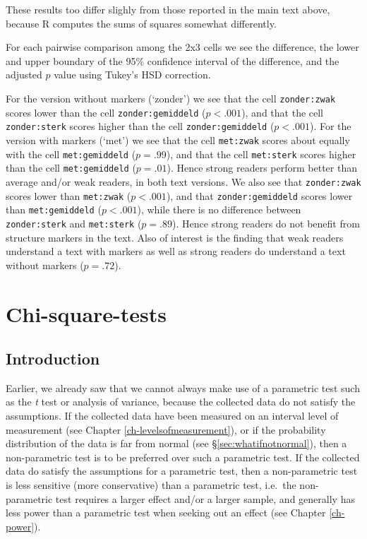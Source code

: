 \documentclass[
]{book}
\begin{document}
These results too differ slighly from those reported in the main text above, because R computes the sums of squares somewhat differently.

For each pairwise comparison among the 2x3 cells we see the difference, the lower and upper boundary of the 95\% confidence interval of the difference, and the adjusted \(p\) value using Tukey's HSD correction.

For the version without markers (`zonder') we see that the cell \texttt{zonder:zwak} scores lower than the cell \texttt{zonder:gemiddeld} (\(p<.001\)), and that the cell \texttt{zonder:sterk} scores higher than the cell \texttt{zonder:gemiddeld} (\(p<.001\)).
For the version with markers (`met') we see that the cell \texttt{met:zwak} scores about equally with the cell \texttt{met:gemiddeld} (\(p=.99\)), and that the cell \texttt{met:sterk} scores higher than the cell \texttt{met:gemiddeld} (\(p=.01\)). Hence strong readers perform better than average and/or weak readers, in both text versions.
We also see that \texttt{zonder:zwak} scores lower than \texttt{met:zwak} (\(p<.001\)),
and that \texttt{zonder:gemiddeld} scores lower than \texttt{met:gemiddeld} (\(p<.001\)),
while there is no difference between \texttt{zonder:sterk} and \texttt{met:sterk} (\(p=.89\)).
Hence strong readers do not benefit from structure markers in the text.
Also of interest is the finding that weak readers understand a text with markers as well as strong readers do understand a text without markers (\(p=.72\)).

\hypertarget{ch-chi-square-tests}{%
\chapter{Chi-square-tests}\label{ch-chi-square-tests}}

\hypertarget{sec:ch16introduction}{%
\section{Introduction}\label{sec:ch16introduction}}

Earlier, we already saw that we cannot always make use of a
parametric test such as the \emph{t} test or analysis of variance, because
the collected data do not satisfy the assumptions. If the collected data
have been measured on an interval level of measurement (see Chapter
\ref{ch-levelsofmeasurement}), or if the probability distribution
of the data is far from normal (see
§\ref{sec:whatifnotnormal}), then a non-parametric test is to be
preferred over such a parametric test. If the collected data
do satisfy the assumptions for a parametric test, then a non-parametric
test is less sensitive (more conservative) than a parametric test, i.e.~the
non-parametric test requires a larger effect and/or a larger sample, and generally
has less power than a parametric test when seeking out an effect
(see Chapter \ref{ch-power}).
\end{document}
